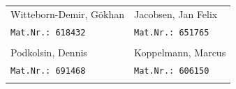 
	\vspace{-1cm}
	\begin{tabular}{ll}
		\large{Witteborn-Demir, Gökhan}  &  \large{Jacobsen, Jan Felix}\\
		\texttt{Mat.Nr.: 618432}    	 &  \texttt{Mat.Nr.: 651765}\\
		& \\
		\large{Podkolsin, Dennis}   	 &  \large{Koppelmann, Marcus}\\
		\texttt{Mat.Nr.: 691468}    	 &  \texttt{Mat.Nr.: 606150}\\
		& \\
	\end{tabular}

	
	\pagebreak
	

